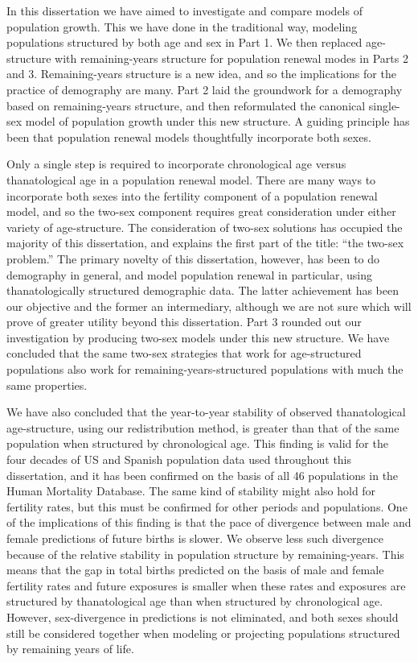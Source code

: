 
In this dissertation we have aimed to investigate and compare models of
population growth. This we have done in the traditional way, modeling populations 
structured by both age and sex in Part 1. We then replaced age-structure with remaining-years
structure for population renewal modes in Parts 2 and 3. Remaining-years
structure is a new idea, and so the implications for the practice of demography are many. Part
2 laid the groundwork for a demography based on remaining-years
structure, and then reformulated the canonical single-sex model of population
growth under this new structure. A guiding principle has been that
population renewal models thoughtfully incorporate both sexes. 

Only a single step is required to incorporate chronological age versus
thanatological age in a population renewal model. There are many ways to incorporate both sexes
into the fertility component of a population renewal model, and so the 
two-sex component requires great consideration under either
variety of age-structure. The consideration of two-sex solutions has occupied
the majority of this dissertation, and explains the first part of 
the title: ``the two-sex problem.'' The primary
novelty of this dissertation, however, has been to do demography in general, and
model population renewal in particular, using thanatologically structured
demographic data. The latter achievement has been our objective and the former
an intermediary, although we are not sure which will prove of greater utility
beyond this dissertation. Part 3 rounded out our investigation by producing
two-sex models under this new structure. We have concluded that the same two-sex 
strategies that work for age-structured populations also work for
remaining-years-structured populations with much the same properties.

We have also concluded that the year-to-year stability of observed
thanatological age-structure, using our redistribution method, is
greater than that of the same population when structured by
chronological age. This finding is valid for the four decades of US and
Spanish population data used throughout this dissertation, and it has been
confirmed on the basis of all 46 populations in the Human Mortality Database.
The same kind of stability might also hold for fertility rates, but this must be
confirmed for other periods and populations. One of the implications of this
finding is that the pace of divergence between male and female predictions of 
future births is slower. We observe less such divergence because of the
relative stability in population structure by remaining-years. This
means that the gap in total births predicted on the basis of male and female 
fertility rates and future exposures is smaller when these rates and exposures 
are structured by thanatological age than when structured by chronological age. However,
sex-divergence in predictions is not eliminated, and both sexes should still
be considered together when modeling or projecting populations structured
by remaining years of life.

